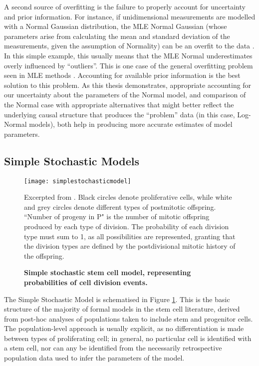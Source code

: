 A second source of overfitting is the failure to properly account for uncertainty and prior information. For instance, if unidimensional measurements are modelled with a Normal Gaussian distribution, the MLE Normal Gaussian (whose parameters arise from calculating the mean and standard deviation of the measurements, given the assumption of Normality) can be an overfit to the data \cite[p.28]{Bishop2006}. In this simple example, this usually means that the MLE Normal underestimates overly influenced by ``outliers''. This is one case of the general overfitting problem seen in MLE methods \cite{Green2017}. Accounting for available prior information is the best solution to this problem. As this thesis demonstrates, appropriate accounting for our uncertainty about the parameters of the Normal model, and comparison of the Normal case with appropriate alternatives that might better reflect the underlying causal structure that produces the ``problem'' data (in this case, Log-Normal models), both help in producing more accurate estimates of model parameters.
 
\subsection{Simple Stochastic Models}
\label{ssec:SSM}

\begin{figure}
\texttt{[image: simplestochasticmodel]}
\centering
\caption{{\bf Simple stochastic stem cell model, representing probabilities of cell division events.}} Excerpted from \cite[p.61]{Fagan2013}. Black circles denote proliferative cells, while white and grey circles denote different types of postmitotic offspring. ``Number of progeny in P" is the number of mitotic offspring produced by each type of division. The probability of each division type must sum to 1, as all possibilities are represented, granting that the division types are defined by the postdivisional mitotic history of the offspring.
\label{fig:SSM}
\end{figure}

The Simple Stochastic Model is schematised in Figure \ref{fig:SSM}. This is the basic structure of the majority of formal models in the stem cell literature, derived from post-hoc analyses of populations taken to include stem and progenitor cells. The population-level approach is usually explicit, as no differentiation is made between types of proliferating cell; in general, no particular cell is identified with a stem cell, nor can any be identified from the necessarily retrospective population data used to infer the parameters of the model. 

